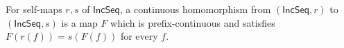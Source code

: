 \begin{definition}
For self-maps $r,s$ of $\mathsf{IncSeq}$, a continuous homomorphism from
$(\mathsf{IncSeq},r)$ to $(\mathsf{IncSeq},s)$ is a map $F$ which is
prefix-continuous and satisfies $F(r(f))=s(F(f))$ for every $f$.
\end{definition}
